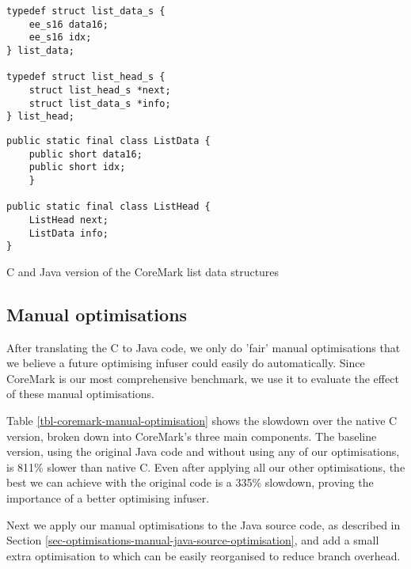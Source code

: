 \begin{listing}[H]
 \centering
 \begin{minipage}[t]{0.45\textwidth}
  \centering
  \begin{verbatim}
typedef struct list_data_s {
    ee_s16 data16;
    ee_s16 idx;
} list_data;

typedef struct list_head_s {
    struct list_head_s *next;
    struct list_data_s *info;
} list_head;
  \end{verbatim}
 \end{minipage}\hfill
 \begin{minipage}[t]{0.45\textwidth}
  \centering
  \begin{verbatim}
public static final class ListData {
    public short data16;
    public short idx;
    }

public static final class ListHead {
    ListHead next;
    ListData info;
}
  \end{verbatim}
 \end{minipage}
\caption{C and Java version of the CoreMark list data structures}
\label{lst-coremark-list-data-structures}
\end{listing}

\subsection{Manual optimisations}
After translating the C to Java code, we only do 'fair' manual optimisations that we believe a future optimising infuser could easily do automatically. Since CoreMark is our most comprehensive benchmark, we use it to evaluate the effect of these manual optimisations.



Table \ref{tbl-coremark-manual-optimisation} shows the slowdown over the native C version, broken down into CoreMark's three main components. The baseline version, using the original Java code and without using any of our optimisations, is 811\% slower than native C. Even after applying all our other optimisations, the best we can achieve with the original code is a 335\% slowdown, proving the importance of a better optimising infuser.

Next we apply our manual optimisations to the Java source code, as described in Section \ref{sec-optimisations-manual-java-source-optimisation}, and add a small extra optimisation to  which can be easily reorganised to reduce branch overhead.


